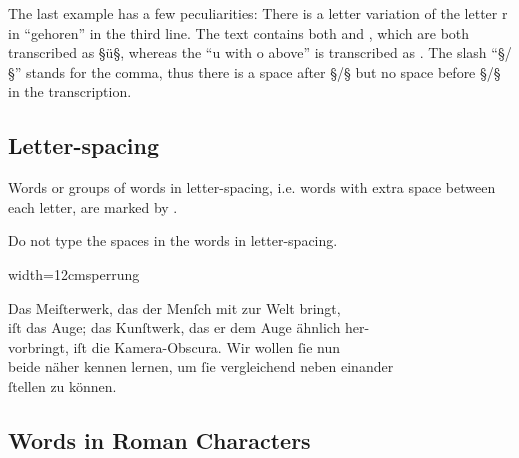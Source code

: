 \begin{note}
The last example has a few peculiarities: There is a letter variation of the letter r in “gehoren” in the third line. The text contains both  and , which are both transcribed as §ü§, whereas the “u with o above” is transcribed as . The slash “§/§” stands for the comma, thus there is a space after §/§ but no space before §/§ in the transcription.
\end{note}



\tocspace
\subsection{Letter-spacing}
\label{section sperrung}

\begin{mainrule}
Words or groups of words in letter-spacing, i.e. words with extra space between each letter, are marked by .
\end{mainrule}

\begin{clarification}
Do not type the spaces in the words in letter-spacing.
\end{clarification}

\vspace{3mm}
\begin{sampleImageSmall}{width=12cm}{sperrung}
\begin{typeLatin}
Das Meiſterwerk, das der Menſch mit zur Welt bringt,  \\
iſt das Auge; das Kunſtwerk, das er dem Auge ähnlich her-  \\
vorbringt, iſt die Kamera-Obscura. Wir wollen ſie nun  \\
beide näher kennen lernen, um ſie vergleichend neben einander  \\
ſtellen zu können.
\end{typeLatin}
\end{sampleImageSmall}

\tocspace
\subsection{Words in Roman Characters}
\label{section words in roman characters}

